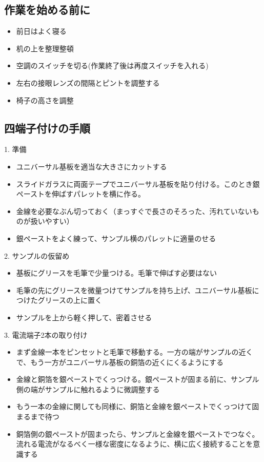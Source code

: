 \subsection{作業を始める前に} 
\begin{itemize}
\item 前日はよく寝る
\item 机の上を整理整頓
\item 空調のスイッチを切る(作業終了後は再度スイッチを入れる)
\item 左右の接眼レンズの間隔とピントを調整する
\item 椅子の高さを調整
\end{itemize}

 
\subsection{四端子付けの手順} 
1. 準備
\begin{itemize}
\item ユニバーサル基板を適当な大きさにカットする
\item スライドガラスに両面テープでユニバーサル基板を貼り付ける。このとき銀ペーストを伸ばすパレットを横に作る。
\item 金線を必要なぶん切っておく（まっすぐで長さのそろった、汚れていないものが扱いやすい）
\item 銀ペーストをよく練って、サンプル横のパレットに適量のせる
\end{itemize}
 
2. サンプルの仮留め
\begin{itemize}
\item 基板にグリースを毛筆で少量つける。毛筆で伸ばす必要はない
\item 毛筆の先にグリースを微量つけてサンプルを持ち上げ、ユニバーサル基板につけたグリースの上に置く
\item サンプルを上から軽く押して、密着させる
\end{itemize}
 
3. 電流端子2本の取り付け
\begin{itemize}
\item まず金線一本をピンセットと毛筆で移動する。一方の端がサンプルの近くで、もう一方がユニバーサル基板の銅箔の近くにくるようにする
\item 金線と銅箔を銀ペーストでくっつける。銀ペーストが固まる前に、サンプル側の端がサンプルに触れるように微調整する
\item もう一本の金線に関しても同様に、銅箔と金線を銀ペーストでくっつけて固まるまで待つ
\item 銅箔側の銀ペーストが固まったら、サンプルと金線を銀ペーストでつなぐ。流れる電流がなるべく一様な密度になるように、横に広く接続することを意識する
 \end{itemize}
 
